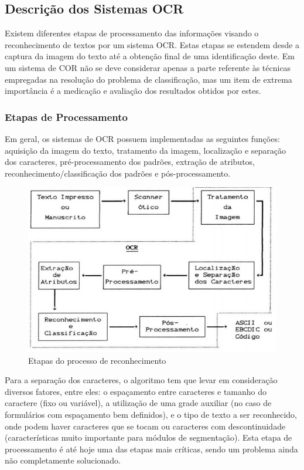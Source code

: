 	\subsection{Descrição dos Sistemas OCR}
		
		Existem diferentes etapas de processamento das informações visando o reconhecimento de textos por um sistema OCR. Estas etapas se estendem desde a captura da imagem do texto até a obtenção final de uma identificação deste. Em um sistema de COR não se deve considerar apenas a parte referente às técnicas empregadas na resolução do problema de classificação, mas um item de extrema importância é a medicação e avaliação dos resultados obtidos por estes.
		
		\subsubsection{Etapas de Processamento}
			
			Em geral, os sistemas de OCR possuem implementadas as seguintes funções: aquisição da imagem do texto, tratamento da imagem, localização e separação dos caracteres, pré-processamento dos padrões, extração de atributos, reconhecimento/classificação dos padrões e pós-processamento.
		
		\begin{figure}[!htb]
			\centering
			\includegraphics[scale=0.5]{img/etapas-de-processamento.jpg}
			\caption{Etapas do processo de reconhecimento}
			\label{Etapas do processo de reconhecimento}
		\end{figure}
		
		Para a separação dos caracteres, o algoritmo tem que levar em consideração diversos fatores, entre eles: o espaçamento entre caracteres e tamanho do caractere (fixo ou variável), a utilização de uma grade auxiliar (no caso de formulários com espaçamento bem definidos), e o tipo de texto a ser reconhecido, onde podem haver caracteres que se tocam ou caracteres com descontinuidade (características muito importante para módulos de segmentação). Esta etapa de processamento é até hoje uma das etapas mais críticas, sendo um problema ainda não completamente solucionado. \cite{koerich2004reconhecimento}
		

